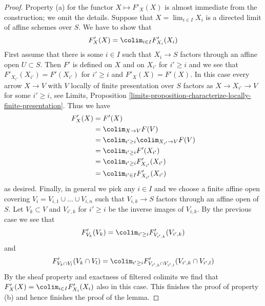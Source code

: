 \begin{proof}
\medskip\noindent
Property (a) for the functor $X \mapsto F'_X(X)$ is almost immediate
from the construction; we omit the details.
Suppose that $X = \lim_{i \in I} X_i$
is a directed limit of affine schemes over $S$. We have to show that
$$
F'_X(X) = \colim_{i \in I} F'_{X_i}(X_i)
$$
First assume that there is some $i \in I$ such that
$X_i \to S$ factors through an affine open $U \subset S$.
Then $F'$ is defined on $X$ and on $X_{i'}$ for $i' \geq i$
and we see that $F'_{X_{i'}}(X_{i'}) = F'(X_{i'})$ for
$i' \geq i$ and $F'_X(X) = F'(X)$. In this case every arrow
$X \to V$ with $V$ locally of finite presentation
over $S$ factors as $X \to X_{i'} \to V$ for some
$i' \geq i$, see Limits, Proposition
\ref{limits-proposition-characterize-locally-finite-presentation}.
Thus we have
\begin{align*}
F'_X(X)
& =
F'(X)  \\
& = \colim_{X \to V} F(V) \\
& =
\colim_{i' \geq i} \colim_{X_{i'} \to V} F(V) \\
& =
\colim_{i' \geq i} F'(X_{i'}) \\
& =
\colim_{i' \geq i} F'_{X_{i'}}(X_{i'}) \\
& =
\colim_{i' \in I} F'_{X_{i'}}(X_{i'})
\end{align*}
as desired. Finally, in general we pick any $i \in I$ and we choose
a finite affine open covering $V_i = V_{i, 1} \cup \ldots \cup V_{i, n}$
such that $V_{i, k} \to S$ factors through an affine open of $S$.
Let $V_k \subset V$ and $V_{i', k}$ for $i' \geq i$
be the inverse images of $V_{i, k}$.
By the previous case we see that
$$
F'_{V_k}(V_k) = \colim_{i' \geq i} F'_{V_{i', k}}(V_{i', k})
$$
and
$$
F'_{V_k \cap V_l}(V_k \cap V_l) =
\colim_{i' \geq i}
F'_{V_{i', k} \cap V_{i', l}}(V_{i', k} \cap V_{i', l})
$$
By the sheaf property and exactness of filtered colimits
we find that $F'_X(X) = \colim_{i \in I} F'_{X_i}(X_i)$
also in this case. This finishes the proof of property (b)
and hence finishes the proof of the lemma.
\end{proof}













